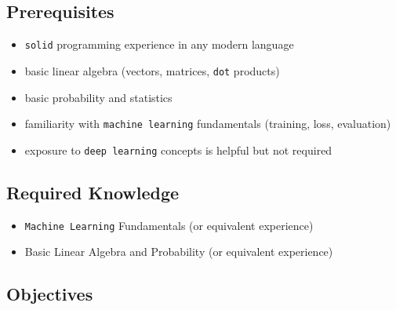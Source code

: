 \documentclass[
]{article}
\providecommand{\tightlist}{%
  \setlength{\itemsep}{0pt}\setlength{\parskip}{0pt}}
\begin{document}
\subsection{Prerequisites}\label{prerequisites}

\begin{itemize}
\tightlist
\item
  \texttt{solid} programming experience in any modern language
\item
  basic linear algebra (vectors, matrices, \texttt{dot} products)
\item
  basic probability and statistics
\item
  familiarity with \texttt{machine\ learning} fundamentals (training,
  loss, evaluation)
\item
  exposure to \texttt{deep\ learning} concepts is helpful but not
  required
\end{itemize}

\subsection{Required Knowledge}\label{required-knowledge}

\begin{itemize}
\tightlist
\item
  \texttt{Machine\ Learning} Fundamentals (or equivalent experience)
\item
  Basic Linear Algebra and Probability (or equivalent experience)
\end{itemize}

\subsection{Objectives}\label{objectives}
\end{document}
